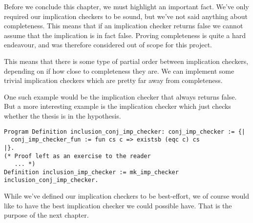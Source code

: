 Before we conclude this chapter, we must highlight an important fact. We've only
required our implication checkers to be sound, but we've not said anything about
completeness. This means that if an implication checker returns false we cannot 
assume that the implication is in fact false. Proving completeness is quite a hard
endeavour, and was therefore considered out of scope for this project.

This means that there is some type of partial order between implication checkers, 
depending on if how close to completeness they are. We can implement some trivial
implication checkers which are pretty far away from completeness. 

One such example would be the implication checker that always returns false. But a
more interesting example is the implication checker which just checks whether the
thesis is in the hypothesis.

\begin{verbatim}
Program Definition inclusion_conj_imp_checker: conj_imp_checker := {| 
  conj_imp_checker_fun := fun cs c => existsb (eqc c) cs
|}.
(* Proof left as an exercise to the reader 
   ... *)
Definition inclusion_imp_checker := mk_imp_checker inclusion_conj_imp_checker.
\end{verbatim}

While we've defined our implication checkers to be best-effort, we of course would
like to have the best implication checker we could possible have. That is the 
purpose of the next chapter.

